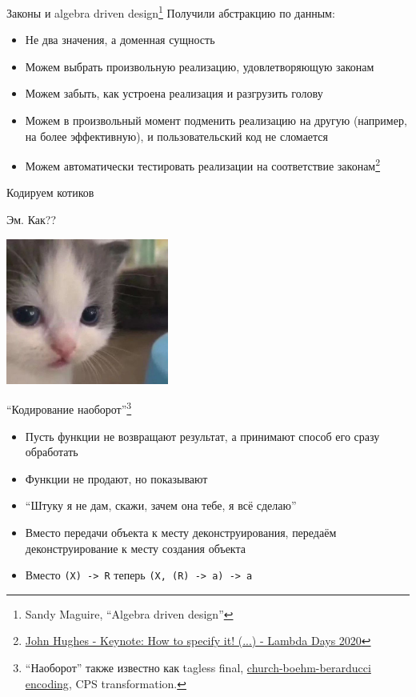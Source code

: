     \begin{frame}[fragile]{Законы и algebra driven design\footnote{Sandy Maguire, ``Algebra driven design''} \popslide}
        Получили абстракцию по данным:
        \begin{itemize}
            \item Не два значения, а доменная сущность
            \item Можем выбрать произвольную реализацию, удовлетворяющую законам
            \item Можем забыть, как устроена реализация и разгрузить голову
            \item Можем в произвольный момент подменить реализацию на другую (например, на более эффективную), и пользовательский код не сломается
            \item Можем автоматически тестировать реализации на соответствие законам\footnote{\href{https://youtu.be/G0NUOst-53U?si=yrFoPQ-kSSPF1Xtb}{\color{blue} John Hughes - Keynote: How to specify it! (...) - Lambda Days 2020}}
        \end{itemize}
    \end{frame}

    \begin{frame}[fragile]{Кодируем котиков}
        \pause
        \begin{center}
            Эм. Как??
            \vspace{1em}

            \includegraphics[width=0.4\textwidth]{figs/wat}
        \end{center}
    \end{frame}

    \begin{frame}[fragile]{``Кодирование наоборот''\footnote{``Наоборот'' также известно как tagless final, \href{https://okmij.org/ftp/tagless-final/course/Boehm-Berarducci.html}{\color{blue} church-boehm-berarducci encoding}, CPS transformation.} \popslide}
        \begin{itemize}
            \item Пусть функции не возвращают результат, а принимают способ его сразу обработать
            \item Функции не продают, но показывают
            \item ``Штуку я не дам, скажи, зачем она тебе, я всё сделаю''
            \item Вместо передачи объекта к месту деконструирования, передаём деконструирование к месту создания объекта
            \item Вместо \texttt{(X) -> R} теперь \texttt{(X, (R) -> a) -> a}
        \end{itemize}
    \end{frame}

